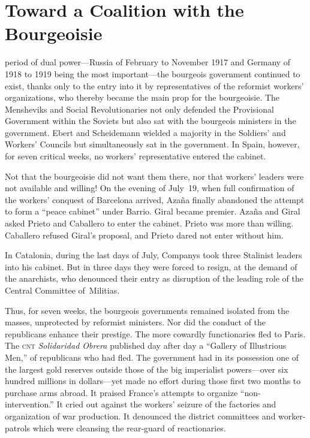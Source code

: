 \chapter{Toward a Coalition with the Bourgeoisie}

 period of dual power---Russia of February to November 1917 and Germany of 1918 to 1919 being the most im\-por\-tant---the bourgeois government continued to exist, thanks only to the entry into it by representatives of the reformist workers’ organizations, who thereby became the main prop for the bourgeoisie. The Mensheviks and Social Revolutionaries not only defended the Provisional Government within the Soviets but also sat with the bourgeois ministers in the government. Ebert and Scheidemann wielded a majority in the Soldiers’ and Workers’ Councils but simultaneously sat in the government. In Spain, however, for seven critical weeks, no workers’ representative entered the cabinet.

Not that the bourgeoisie did not want them there, nor that workers’ leaders were not available and willing! On the evening of July~19, when full confirmation of the workers’ conquest of Barcelona arrived, Azaña finally abandoned the attempt to form a ``peace cabinet'' under Barrio. Giral became premier. Azaña and Giral asked Prieto and Caballero to enter the cabinet. Prieto was more than willing. Caballero refused Giral’s proposal, and Prieto dared not enter without him.

In Catalonia, during the last days of July, Companys took three Stalinist leaders into his cabinet. But in three days they were forced to resign, at the demand of the anarchists, who denounced their entry as disruption of the leading role of the Central Committee of~Militias.

Thus, for seven weeks, the bourgeois governments remained isolated from the masses, unprotected by reformist ministers. Nor did the conduct of the republicans enhance their prestige. The more cowardly functionaries fled to Paris. The \textsc{cnt} \emph{Solidaridad Obrera} published day after day a ``Gallery of Illustrious Men,'' of republicans who had fled. The government had in its possession one of the largest gold reserves outside those of the big imperialist powers---over six hundred millions in dollars---yet made no effort during those first two months to purchase arms abroad. It praised France’s attempts to organize ``non-intervention.'' It cried out against the workers’ seizure of the factories and organization of war production. It denounced the district committees and worker-patrols which were cleansing the rear-guard of reactionaries.

